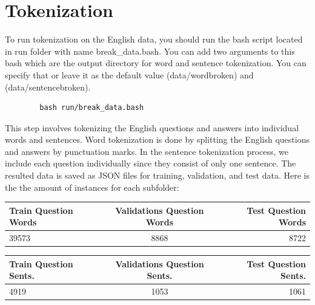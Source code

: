 \documentclass{adonis}
\begin{document}
  \section{Tokenization}
	
        To run tokenization on the English data, you should run the bash script located in run folder with name break\_data.bash. You can add two arguments to this bash which are the output directory for word and sentence tokenization. You can specify that or leave it as the default value (data/wordbroken) and (data/sentencebroken).
        \begin{verbatim}
        bash run/break_data.bash
        \end{verbatim}

  This step involves tokenizing the English questions and answers into individual words and sentences. Word tokenization is done by splitting the English questions and answers by punctuation marks. In the sentence tokenization process, we include each question individually since they consist of only one sentence. The resulted data is saved as JSON files for training, validation, and test data. Here is the the amount of instances for each subfolder:


  \begin{table}[H]
  \centering
  \setlength{\tabcolsep}{0.7em}
  {\renewcommand{\arraystretch}{1.2}
    \begin{minipage}{15.5cm}
    \begin{tabular}{ | l | c | r | }
    \hline
    Train Question Words & Validations Question Words & Test Question Words \\ \hline
    39573 & 8868 & 8722 \\ \hline
  \end{tabular}
  \end{minipage}}
  \end{table}



\begin{table}[H]
  \centering
  \setlength{\tabcolsep}{0.8em}
  {\renewcommand{\arraystretch}{1.2}
    \begin{minipage}{15.5cm}
  \begin{tabular}{ | l | c | r | }
    \hline
    Train Question Sents. & Validations Question Sents. & Test Question Sents. \\ \hline
    4919 & 1053 & 1061 \\ \hline
  \end{tabular}
  \end{minipage}}
  \end{table}
\end{document}
